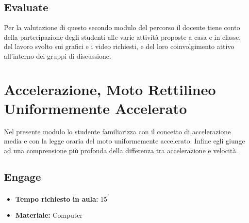 \documentclass{report} \usepackage[T1]{fontenc} \usepackage[italian]{babel}
\begin{document}
\section{Evaluate}
Per la valutazione di questo secondo modulo del percorso il docente tiene conto della
partecipazione degli studenti alle varie attività proposte a casa e in classe,
del lavoro svolto sui grafici e i video richiesti, e del loro coinvolgimento attivo
all’interno dei gruppi di discussione.

\chapter{Accelerazione, Moto Rettilineo Uniformemente Accelerato}\label{accelerazione}
Nel presente modulo lo studente familiarizza con il concetto di accelerazione
media e con la legge oraria del moto uniformemente accelerato.
Infine egli giunge ad una comprensione più profonda della differenza
tra accelerazione e velocità.

\section{Engage}

\begin{itemize}
\item \textbf{Tempo richiesto in aula:} 15\textsuperscript{$\prime$}
\item \textbf{Materiale:} Computer
\end{itemize}
\end{document}
